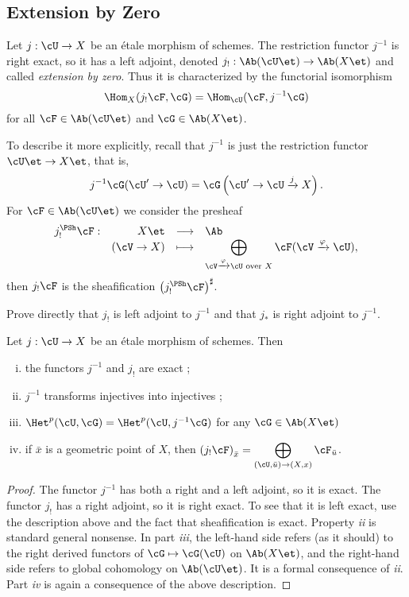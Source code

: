 \subsection{Extension by Zero}

\begin{defi}
Let $j: \cU \to X$ be an \'etale morphism of schemes. The restriction functor $j^{-1}$ is right exact, so it has a left adjoint, denoted $j_! : \Ab(\cU\et)\to \Ab(X\et)$ and called \emph{extension by zero}. Thus it is characterized by the functorial isomorphism
$$\Hom_X(j_!\cF, \cG) = \Hom_\cU(\cF, j^{-1}\cG)$$
for all $\cF \in \Ab(\cU\et)$ and $\cG \in \Ab(X\et)$.
\end{defi}

To describe it more explicitly, recall that $j^{-1}$ is just the restriction functor $\cU\et\to X\et$, that is, 
$$
j^{-1}\cG(\cU'\to \cU) = \cG \left(\cU'\to \cU \xrightarrow{j} X\right).$$
For $\cF \in \Ab(\cU\et)$ we consider the presheaf
$$
\begin{array}{rrcl}
j_!^{\PSh}\cF: & X\et &\longrightarrow & \Ab\\
& (\cV\to X) & \longmapsto & \displaystyle \bigoplus_{\cV\xrightarrow{\varphi} \cU\text{ over }X} \cF(\cV\xrightarrow{\varphi}\cU),
\end{array}
$$
then $j_!\cF$ is the sheafification $\left(j_!^{\PSh}\cF\right)^\sharp$.

\begin{exo}
Prove directly that $j_!$ is left adjoint to $j^{-1}$ and that $j_*$ is right adjoint to $j^{-1}$.
\end{exo}

\begin{prop}
Let $j : \cU \to X$ be an \'etale morphism of schemes. Then
\begin{enumerate}[i.]
\item the functors $j^{-1}$ and $j_!$ are exact ;
\item $j^{-1}$ transforms injectives into injectives ;
\item $\Het^p(\cU, \cG)= \Het^p(\cU, j^{-1}\cG)$ for any $\cG \in \Ab(X\et)$
\item if $\bar x$ is a geometric point of $X$, then $\left(j_!\cF\right)_{\bar x} =\displaystyle \bigoplus_{(\cU, \bar u) \to (X, x)} \cF_{\bar{u}}$.
\end{enumerate}
\end{prop}

\begin{proof}
The functor $j^{-1}$ has both a right and a left adjoint, so it is exact. The functor $j_!$ has a right adjoint, so it is right exact. To see that it is left exact, use the description above and the fact that sheafification is exact. Property {\it ii} is standard general nonsense. In part {\it iii}, the left-hand side refers (as it should) to the right derived functors of $\cG\mapsto \cG(\cU)$ on $\Ab(X\et)$, and the right-hand side refers to global cohomology on $\Ab(\cU\et)$. It is a formal consequence of {\it ii}. Part {\it iv} is again a consequence of the above description.
\end{proof}

